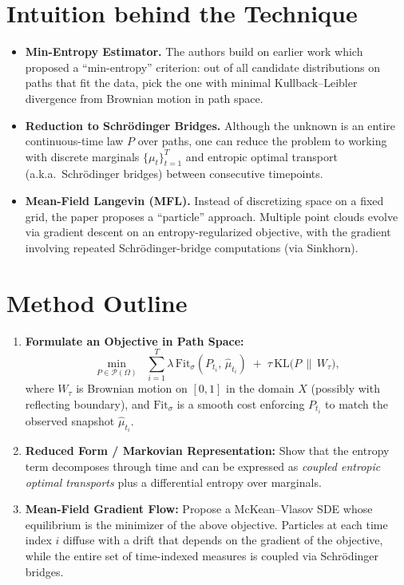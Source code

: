 \documentclass{article}
\begin{document}
\section{Intuition behind the Technique}
\begin{itemize}
    \item \textbf{Min-Entropy Estimator.} The authors build on earlier work which proposed a ``min-entropy'' criterion: out of all candidate distributions on paths that fit the data, pick the one with minimal Kullback--Leibler divergence from Brownian motion in path space.
    \item \textbf{Reduction to Schr\"odinger Bridges.} Although the unknown is an entire continuous-time law $P$ over paths, one can reduce the problem to working with discrete marginals $\{\mu_t\}_{t=1}^T$ and entropic optimal transport (a.k.a.\ Schr\"odinger bridges) between consecutive timepoints.
    \item \textbf{Mean-Field Langevin (MFL).} Instead of discretizing space on a fixed grid, the paper proposes a ``particle'' approach. Multiple point clouds evolve via gradient descent on an entropy-regularized objective, with the gradient involving repeated Schr\"odinger-bridge computations (via Sinkhorn).
\end{itemize}

\section{Method Outline}
\begin{enumerate}
    \item \textbf{Formulate an Objective in Path Space:} 
    \[
        \min_{P \in \mathcal{P}(\Omega)} \;\; \sum_{i=1}^T \lambda\, \mathrm{Fit}_\sigma(P_{t_i},\, \hat{\mu}_{t_i}) \;+\; \tau\, \mathrm{KL}\bigl(P \,\|\, W_\tau\bigr),
    \]
    where $W_\tau$ is Brownian motion on $[0,1]$ in the domain $X$ (possibly with reflecting boundary), and $\mathrm{Fit}_\sigma$ is a smooth cost enforcing $P_{t_i}$ to match the observed snapshot $\hat{\mu}_{t_i}$.
    \item \textbf{Reduced Form / Markovian Representation:} Show that the entropy term decomposes through time and can be expressed as \emph{coupled entropic optimal transports} plus a differential entropy over marginals. 
    \item \textbf{Mean-Field Gradient Flow:} Propose a McKean--Vlasov SDE whose equilibrium is the minimizer of the above objective. Particles at each time index $i$ diffuse with a drift that depends on the gradient of the objective, while the entire set of time-indexed measures is coupled via Schr\"odinger bridges.
\end{enumerate}
\end{document}
